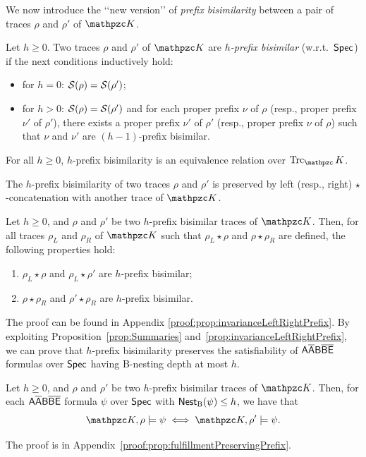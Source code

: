 We now introduce the \lq\lq new version\rq\rq{} of \emph{prefix bisimilarity}  between a pair of traces $\rho$ and $\rho'$ of $\Ku$.
%
\begin{definition}
Let $h\geq 0$. Two traces $\rho$ and $\rho'$  of $\Ku$  are \emph{$h$-prefix bisimilar} (w.r.t.\ $\textsf{Spec}$) if the next conditions inductively hold:
\begin{itemize}
  \item for $h=0$: $\mathcal{S}(\rho)=\mathcal{S}(\rho')$;
  \item for $h>0$: $\mathcal{S}(\rho)=\mathcal{S}(\rho')$  and for each proper prefix $\nu$ of $\rho$ (resp., proper prefix $\nu'$ of $\rho'$), there exists
  a proper prefix $\nu'$ of $\rho'$ (resp., proper prefix $\nu$ of $\rho$) such that $\nu$ and $\nu'$ are $(h-1)$-prefix bisimilar.
\end{itemize}
\end{definition}
%
\begin{property}
For all $h\geq 0$, $h$-prefix   bisimilarity is an equivalence relation over $\Trk_\Ku$.
\end{property}

The $h$-prefix  bisimilarity of two traces $\rho$ and $\rho'$ is preserved by left (resp., right) \mbox{$\star$-concatenation} with another trace of $\Ku$.
%
\begin{proposition}\label{prop:invarianceLeftRightPrefix} Let $h\geq 0$, and $\rho$ and $\rho'$ be two $h$-prefix  bisimilar traces of  $\Ku$. Then, for all traces $\rho_L$ and $\rho_R$ of $\Ku$ such that $\rho_L \star \rho$ and  $\rho \star \rho_R$ are defined, the following properties hold:
\begin{enumerate}
    \item $\rho_L\star \rho$ and $\rho_L\star \rho'$ are $h$-prefix   bisimilar; 
    \item $\rho\star \rho_R$ and $\rho'\star \rho_R$ are $h$-prefix  bisimilar.
\end{enumerate}
\end{proposition}
The proof can be found in Appendix \ref{proof:prop:invarianceLeftRightPrefix}. 
%
By exploiting Proposition~\ref{prop:Summaries} and~\ref{prop:invarianceLeftRightPrefix},
we can prove that $h$-prefix  bisimilarity preserves the satisfiability of $\mathsf{A\overline{A}B\overline{B}\overline{E}}$ formulas over $\textsf{Spec}$ having B-nesting depth at most $h$.

\begin{proposition}\label{prop:fulfillmentPreservingPrefix} Let $h\geq 0$, and $\rho$ and $\rho'$ be two $h$-prefix bisimilar traces of $\Ku$. Then, for each $\mathsf{A\overline{A}B\overline{B}\overline{E}}$
formula $\psi$ over $\textsf{Spec}$ with $\operatorname{\mathsf{Nest}_B}(\psi)\leq h$, we have that
\[\Ku,\rho\models\psi\iff \Ku,\rho'\models\psi.\]
\end{proposition}
The proof is in Appendix~\ref{proof:prop:fulfillmentPreservingPrefix}.

